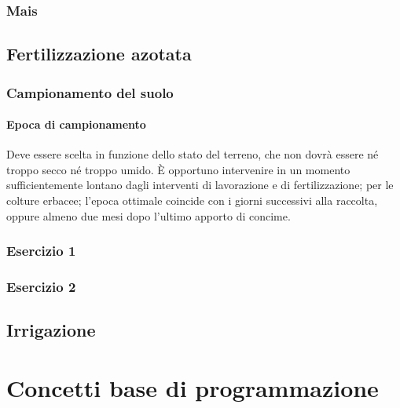 \documentclass[
]{book}
\theoremstyle{definition}
\theoremstyle{definition}
\theoremstyle{definition}
\theoremstyle{definition}
\theoremstyle{remark}
\begin{document}
\hypertarget{mais}{%
\subsection{Mais}\label{mais}}

\hypertarget{fertilizzazione-azotata}{%
\section{Fertilizzazione azotata}\label{fertilizzazione-azotata}}

\hypertarget{campionamento-del-suolo}{%
\subsection{Campionamento del suolo}\label{campionamento-del-suolo}}

\hypertarget{epoca-di-campionamento}{%
\subsubsection{Epoca di campionamento}\label{epoca-di-campionamento}}

Deve essere scelta in funzione dello stato del terreno, che non dovrà essere né troppo secco né troppo umido. È opportuno intervenire in un momento sufficientemente lontano dagli interventi di lavorazione e di fertilizzazione; per le colture erbacee; l'epoca ottimale coincide con i giorni successivi alla raccolta, oppure almeno due mesi dopo l'ultimo apporto di concime.

\hypertarget{esercizio-1}{%
\subsection{Esercizio 1}\label{esercizio-1}}

\hypertarget{esercizio-2}{%
\subsection{Esercizio 2}\label{esercizio-2}}

\hypertarget{irrigazione}{%
\section{Irrigazione}\label{irrigazione}}

\hypertarget{cross}{%
\chapter{Concetti base di programmazione}\label{cross}}
\end{document}
